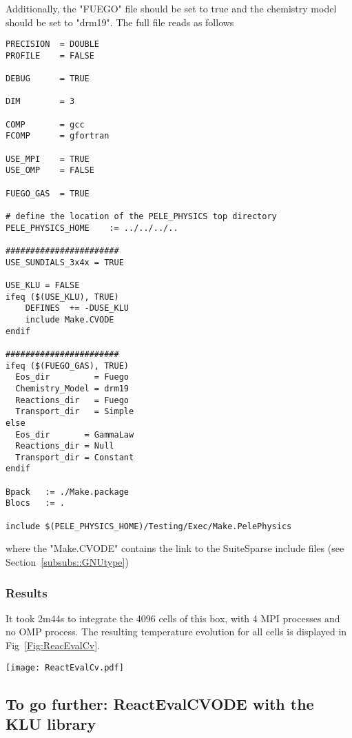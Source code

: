 \documentclass[12pt]{article}
\begin{document}
Additionally, the "FUEGO" file should be set to true and the chemistry model should be set to "drm19". The full file reads as follows
\begin{verbatim}
PRECISION  = DOUBLE                                                                                                                   
PROFILE    = FALSE

DEBUG      = TRUE

DIM        = 3

COMP       = gcc
FCOMP      = gfortran

USE_MPI    = TRUE
USE_OMP    = FALSE

FUEGO_GAS  = TRUE

# define the location of the PELE_PHYSICS top directory
PELE_PHYSICS_HOME    := ../../../..

#######################
USE_SUNDIALS_3x4x = TRUE

USE_KLU = FALSE
ifeq ($(USE_KLU), TRUE)
    DEFINES  += -DUSE_KLU
    include Make.CVODE
endif

#######################
ifeq ($(FUEGO_GAS), TRUE)
  Eos_dir         = Fuego
  Chemistry_Model = drm19
  Reactions_dir   = Fuego
  Transport_dir   = Simple
else
  Eos_dir       = GammaLaw
  Reactions_dir = Null
  Transport_dir = Constant
endif

Bpack   := ./Make.package
Blocs   := .

include $(PELE_PHYSICS_HOME)/Testing/Exec/Make.PelePhysics         
\end{verbatim}
where the "Make.CVODE" contains the link to the SuiteSparse include files (see Section~\ref{subsubs::GNUtype})

\subsubsection{Results}
It took 2m44s to integrate the 4096 cells of this box, with 4 MPI processes and no OMP process. The resulting temperature evolution for all cells is displayed in Fig~\ref{Fig:ReacEvalCv}.

\begin{figure*}[http]
\centering
\texttt{[image: ReactEvalCv.pdf]}
\caption{Evolution of temperature in the 2x1024x2 example box, using a CV reactor and a dense direct solve, and computed with the DRM mechanism. Black: $t=0$, red: $t=1e-05s$.}
\label{Fig:ReacEvalCv}
\end{figure*}

\subsection{To go further: ReactEvalCVODE with the KLU library}
\label{subs::ReactEvalCVODEKLU}
\end{document}

